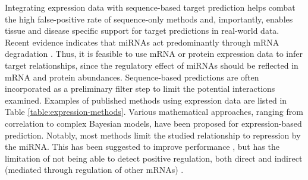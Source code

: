 Integrating expression data with sequence-based target prediction helps combat
the high false-positive rate of sequence-only methods and, importantly,
enables tissue and disease specific support for target predictions in real-world
data. Recent evidence indicates that miRNAs act predominantly through
mRNA degradation \citep{Guo2010}. Thus, it is feasible to use mRNA or protein
expression data to infer target relationships, since the regulatory effect of
miRNAs should be reflected in mRNA and protein abundances. Sequence-based
predictions are often incorporated as a preliminary filter step to limit the
potential interactions examined. Examples of published methods using
expression data are listed in Table \ref{table:expression-methods}. Various
mathematical approaches, ranging from correlation to complex Bayesian models,
have been proposed for expression-based prediction. Notably, most methods
limit the studied relationship to repression by the miRNA. This has
been suggested to improve performance \citep{Muniategui2013}, but
has the limitation of not being able to detect positive regulation,
both direct and indirect (mediated through regulation of other mRNAs)
\citep{Engelmann2012}.



